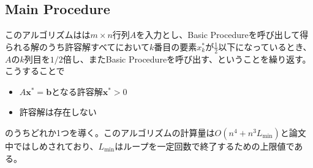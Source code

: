 \subsection{Main Procedure}
このアルゴリズムはは$m \times n$行列$A$を入力とし、Basic Procedureを呼び出して得られる解のうち許容解すべてにおいて$k$番目の要素$x_k^*$が$\frac{1}{2}$以下になっているとき、$A$の$k$列目を$1 / 2$倍し、またBasic Procedureを呼び出す、ということを繰り返す。こうすることで
\begin{itemize}
  \item $A\mathbf{x}^*=\mathbf{b}$となる許容解$\mathbf{x}^* > 0$
  \item 許容解は存在しない
\end{itemize}
のうちどれか1つを導く。このアルゴリズムの計算量は$O\left(n^4 + n^3 L_{\text{min}}\right)$と論文中\cite{Chubanov}ではしめされており、$L_{\text{min}}$はループを一定回数で終了するための上限値である。
